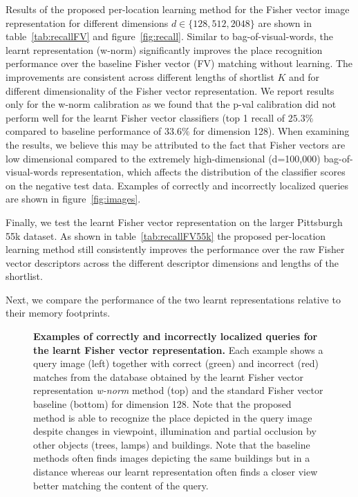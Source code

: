     Results of the proposed per-location learning method for the Fisher vector image representation for different dimensions $d\in\{128, 512, 2048\}$ 
    are shown in table~\ref{tab:recallFV} and figure~\ref{fig:recall}.
    Similar to bag-of-visual-words, the learnt representation (w-norm) significantly improves the place recognition performance over the baseline Fisher vector (FV) matching without learning. The improvements are consistent across different lengths of shortlist $K$ and for different dimensionality of the Fisher vector representation. 
    We report results only for the w-norm calibration as we found that the p-val calibration did not perform well for the learnt Fisher vector classifiers (top 1 recall of $25.3\%$ compared to baseline performance of $33.6\%$ for dimension 128). When examining the results, we believe this may be attributed to the fact that Fisher vectors are low dimensional compared to the extremely high-dimensional (d=100,000) bag-of-visual-words representation, which affects the distribution of the classifier scores on the negative test data. 
    Examples of correctly and incorrectly localized queries are shown in figure~\ref{fig:images}. 
    
        Finally, we test the learnt Fisher vector representation on the larger Pittsburgh 55k dataset. As shown in table~\ref{tab:recallFV55k} the proposed per-location learning method still consistently improves the performance over the raw Fisher vector descriptors across the different descriptor dimensions and lengths of the shortlist. 

\noindent
        Next, we compare the performance of the two learnt representations relative to their memory footprints.  

    \begin{figure}[tbp]
      
      \caption{
          \textbf{Examples of correctly and incorrectly localized queries for the learnt Fisher vector representation.}
          Each example shows a query image (left) together with correct (green) and incorrect (red) matches from the database obtained by the learnt Fisher vector representation \emph{w-norm} method (top) and the standard Fisher vector baseline (bottom) for dimension 128. Note that the proposed method is able to recognize the place depicted in the query image despite changes in viewpoint, illumination and partial occlusion by other objects (trees, lamps) and buildings. 
          Note that the baseline methods often finds images depicting the same buildings but in a distance whereas our learnt representation often finds a closer view better matching the content of the query.        
      }
      \label{fig:images_bow}
    \end{figure}
    
